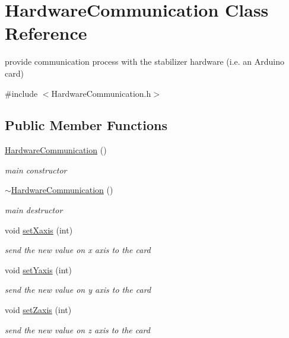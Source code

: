 \hypertarget{class_hardware_communication}{\section{Hardware\-Communication Class Reference}
\label{class_hardware_communication}
}


provide communication process with the stabilizer hardware (i.\-e. an Arduino card)  




{\ttfamily \#include $<$Hardware\-Communication.\-h$>$}

\subsection*{Public Member Functions}
\begin{DoxyCompactItemize}
\item 
\hypertarget{class_hardware_communication_a333b7819b3c30f0ca35354eb28d3b9b7}{\hyperlink{class_hardware_communication_a333b7819b3c30f0ca35354eb28d3b9b7}{Hardware\-Communication} ()}\label{class_hardware_communication_a333b7819b3c30f0ca35354eb28d3b9b7}

\begin{DoxyCompactList}\small\item\em main constructor \end{DoxyCompactList}\item 
\hypertarget{class_hardware_communication_a6ec9e43b718aa48e8b2e53e4c9d6edeb}{\hyperlink{class_hardware_communication_a6ec9e43b718aa48e8b2e53e4c9d6edeb}{$\sim$\-Hardware\-Communication} ()}\label{class_hardware_communication_a6ec9e43b718aa48e8b2e53e4c9d6edeb}

\begin{DoxyCompactList}\small\item\em main destructor \end{DoxyCompactList}\item 
void \hyperlink{class_hardware_communication_aca3cd96823f5fdd9ae5621fcba282048}{set\-Xaxis} (int)
\begin{DoxyCompactList}\small\item\em send the new value on x axis to the card \end{DoxyCompactList}\item 
void \hyperlink{class_hardware_communication_a5ce92a2ac6ef15a648f2cc3e8b7c836a}{set\-Yaxis} (int)
\begin{DoxyCompactList}\small\item\em send the new value on y axis to the card \end{DoxyCompactList}\item 
void \hyperlink{class_hardware_communication_a878052b214da53fdf880c69890fd0620}{set\-Zaxis} (int)
\begin{DoxyCompactList}\small\item\em send the new value on z axis to the card \end{DoxyCompactList}\end{DoxyCompactItemize}


